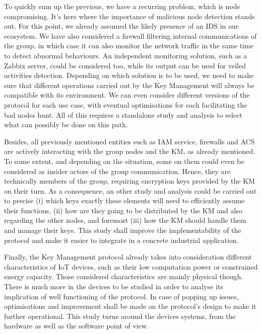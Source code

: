 To quickly sum up the previous, we have a recurring problem, which is node compromising. It’s here where the importance of malicious node detection stands out. For this point, we already assumed the likely presence of an IDS in our ecosystem. We have also considered a firewall filtering internal communications of the group, in which case it can also monitor the network traffic in the same time to detect abnormal behaviours. An independent monitoring solution, such as a Zabbix server, could be considered too, while its output can be used for veiled activities detection. Depending on which solution is to be used, we need to make sure that different operations carried out by the Key Management will always be compatible with its environment. We can even consider different versions of the protocol for each use case, with eventual optimisations for each facilitating the bad nodes hunt. All of this requires a standalone study and analysis to select what can possibly be done on this path.

Besides, all previously mentioned entities such as IAM service, firewalls and ACS are actively interacting with the group nodes and the KM, as already mentioned. To some extent, and depending on the situation, some on them could even be considered as insider actors of the group communication. Hence, they are technically members of the group, requiring encryption keys provided by the KM on their turn. As a consequence, an other study and analysis could be carried out to precise (i) which keys exactly these elements will need to efficiently assume their functions, (ii) how are they going to be distributed by the KM and also regarding the other nodes, and foremost (iii) how the KM should handle them and manage their keys. This study shall improve the implementability of the protocol and make it easier to integrate in a concrete industrial application.

Finally, the Key Management protocol already takes into consideration different characteristics of IoT devices, such as their low computation power or constrained energy capacity. Those considered characteristics are mainly physical though. There is much more in the devices to be studied in order to analyse its implication of well functioning of the protocol. In case of popping up issues, optimisations and improvement shall be made on the protocol’s design to make it further operational. This study turns around the devices systems, from the hardware as well as the software point of view.

